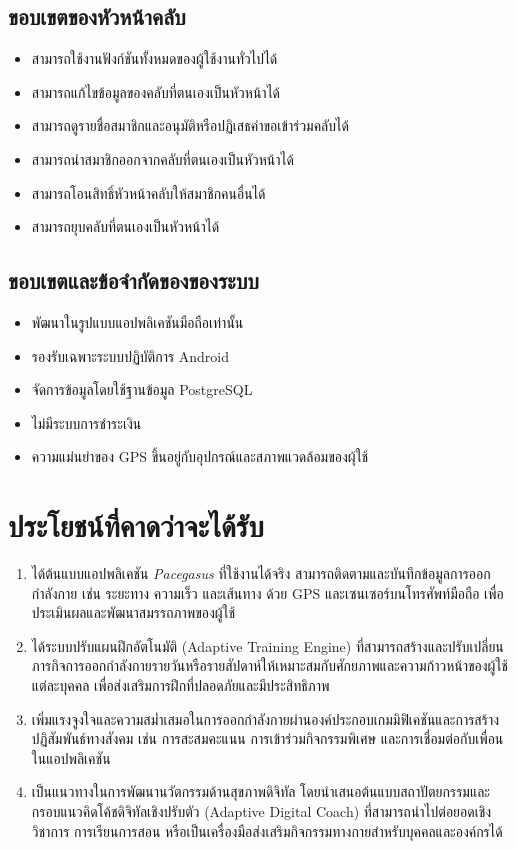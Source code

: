\subsection{ขอบเขตของหัวหน้าคลับ}
\begin{itemize}[label={-}]
    \item สามารถใช้งานฟังก์ชันทั้งหมดของผู้ใช้งานทั่วไปได้
    \item สามารถแก้ไขข้อมูลของคลับที่ตนเองเป็นหัวหน้าได้
    \item สามารถดูรายชื่อสมาชิกและอนุมัติหรือปฏิเสธคำขอเข้าร่วมคลับได้
    \item สามารถนำสมาชิกออกจากคลับที่ตนเองเป็นหัวหน้าได้
    \item สามารถโอนสิทธิ์หัวหน้าคลับให้สมาชิกคนอื่นได้
    \item สามารถยุบคลับที่ตนเองเป็นหัวหน้าได้
\end{itemize}

\subsection{ขอบเขตและข้อจำกัดของของระบบ}
\begin{itemize}[label={-}]
    \item พัฒนาในรูปแบบแอปพลิเคชันมือถือเท่านั้น
    \item รองรับเฉพาะระบบปฏิบัติการ Android
    \item จัดการข้อมูลโดยใช้ฐานข้อมูล PostgreSQL
    \item ไม่มีระบบการชำระเงิน
    \item ความแม่นยำของ GPS ขึ้นอยู่กับอุปกรณ์และสภาพแวดล้อมของผุ้ใช้
\end{itemize}

\section{ประโยชน์ที่คาดว่าจะได้รับ}

\begin{enumerate}[label=\arabic*)]
    \item ได้ต้นแบบแอปพลิเคชัน \textit{Pacegasus} ที่ใช้งานได้จริง สามารถติดตามและบันทึกข้อมูลการออกกำลังกาย เช่น ระยะทาง ความเร็ว และเส้นทาง ด้วย GPS และเซนเซอร์บนโทรศัพท์มือถือ เพื่อประเมินผลและพัฒนาสมรรถภาพของผู้ใช้
    \item ได้ระบบปรับแผนฝึกอัตโนมัติ (Adaptive Training Engine) ที่สามารถสร้างและปรับเปลี่ยนภารกิจการออกกำลังกายรายวันหรือรายสัปดาห์ให้เหมาะสมกับศักยภาพและความก้าวหน้าของผู้ใช้แต่ละบุคคล เพื่อส่งเสริมการฝึกที่ปลอดภัยและมีประสิทธิภาพ
    \item เพิ่มแรงจูงใจและความสม่ำเสมอในการออกกำลังกายผ่านองค์ประกอบเกมมิฟิเคชันและการสร้างปฏิสัมพันธ์ทางสังคม เช่น การสะสมคะแนน การเข้าร่วมกิจกรรมพิเศษ และการเชื่อมต่อกับเพื่อนในแอปพลิเคชัน
    \item เป็นแนวทางในการพัฒนานวัตกรรมด้านสุขภาพดิจิทัล โดยนำเสนอต้นแบบสถาปัตยกรรมและกรอบแนวคิดโค้ชดิจิทัลเชิงปรับตัว (Adaptive Digital Coach) ที่สามารถนำไปต่อยอดเชิงวิชาการ การเรียนการสอน หรือเป็นเครื่องมือส่งเสริมกิจกรรมทางกายสำหรับบุคคลและองค์กรได้
\end{enumerate}
